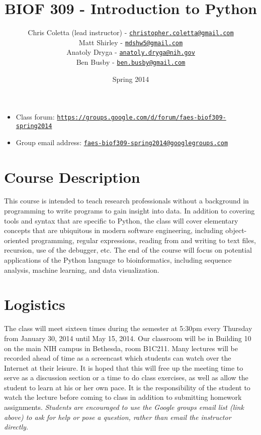\documentclass{article}
\title{BIOF 309 - Introduction to Python}  %
\date{Spring 2014}   %
\author{Chris Coletta (lead instructor) - \href{mailto:christopher.coletta@gmail.com}{\texttt{christopher.coletta@gmail.com}} \\ 
              Matt Shirley - \href{mailto:mdshw5@gmail.com}{\texttt{mdshw5@gmail.com}} \\
              Anatoly Dryga - \href{mailto:anatoly.dryga@nih.gov}{\texttt{anatoly.dryga@nih.gov}} \\
              Ben Busby - \href{mailto:ben.busby@gmail.com}{\texttt{ben.busby@gmail.com}} }    %
\begin{document}

\maketitle                 %


\begin{itemize}
   \item  Class forum: \href{https://groups.google.com/d/forum/faes_biof309_spring2014}{\texttt{https://groups.google.com/d/forum/faes-biof309-spring2014}}
   \item  Group email address: \href{mailto:faes-biof309-spring2014@googlegroups.com}{\texttt{faes-biof309-spring2014@googlegroups.com}}
\end{itemize}
\section{Course Description}
This course is intended to teach research professionals without a background in programming to write programs to gain insight into data. In addition to covering tools and syntax that are specific to Python, the class will cover elementary concepts that are ubiquitous in modern software engineering, including object-oriented programming, regular expressions, reading from and writing to text files, recursion, use of the debugger, etc. The end of the course will focus on potential applications of the Python language to bioinformatics, including sequence analysis, machine learning, and data visualization.
\section{Logistics}
The class will meet sixteen times during the semester at 5:30pm every Thursday from January 30, 2014 until May 15, 2014. Our classroom will be in Building 10 on the main NIH campus in Bethesda, room B1C211. Many lectures will be recorded ahead of time as a screencast which students can watch over the Internet at their leisure. It is hoped that this will free up the meeting time to serve as a discussion section or a time to do class exercises, as well as allow the student to learn at his or her own pace. It is the responsibility of the student to watch the lecture before coming to class in addition to submitting homework assignments. \emph{Students are encouraged to use the Google groups email list (link above) to ask for help or pose a question, rather than email the instructor directly.} 
\end{document}
